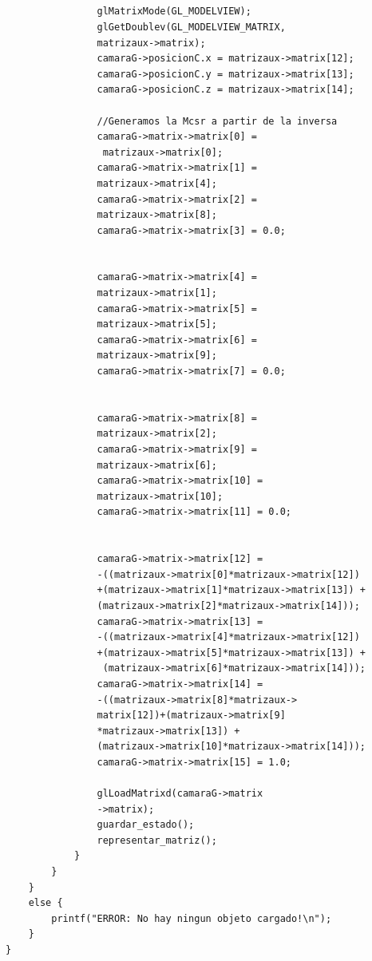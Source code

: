 \documentclass[12pt,a4paper]{article}
\begin{document}
\begin{enumerate}
\begin{lstlisting}
        		

        		
        		
        		glMatrixMode(GL_MODELVIEW);
        		glGetDoublev(GL_MODELVIEW_MATRIX,
        		matrizaux->matrix);
        		camaraG->posicionC.x = matrizaux->matrix[12];
        		camaraG->posicionC.y = matrizaux->matrix[13];
        		camaraG->posicionC.z = matrizaux->matrix[14];

				//Generamos la Mcsr a partir de la inversa
				camaraG->matrix->matrix[0] =
				 matrizaux->matrix[0];
				camaraG->matrix->matrix[1] = 
				matrizaux->matrix[4];
				camaraG->matrix->matrix[2] = 
				matrizaux->matrix[8];	
				camaraG->matrix->matrix[3] = 0.0;

	
				camaraG->matrix->matrix[4] = 
				matrizaux->matrix[1];
				camaraG->matrix->matrix[5] = 
				matrizaux->matrix[5];	
				camaraG->matrix->matrix[6] = 
				matrizaux->matrix[9];	
				camaraG->matrix->matrix[7] = 0.0;
	
	
				camaraG->matrix->matrix[8] = 
				matrizaux->matrix[2];	
				camaraG->matrix->matrix[9] = 
				matrizaux->matrix[6];
				camaraG->matrix->matrix[10] = 
				matrizaux->matrix[10];
				camaraG->matrix->matrix[11] = 0.0;
	
	
				camaraG->matrix->matrix[12] = 
				-((matrizaux->matrix[0]*matrizaux->matrix[12])
				+(matrizaux->matrix[1]*matrizaux->matrix[13]) +
				(matrizaux->matrix[2]*matrizaux->matrix[14]));
				camaraG->matrix->matrix[13] = 
				-((matrizaux->matrix[4]*matrizaux->matrix[12])
				+(matrizaux->matrix[5]*matrizaux->matrix[13]) +
				 (matrizaux->matrix[6]*matrizaux->matrix[14]));				
				camaraG->matrix->matrix[14] = 
				-((matrizaux->matrix[8]*matrizaux->
				matrix[12])+(matrizaux->matrix[9]
				*matrizaux->matrix[13]) + 
				(matrizaux->matrix[10]*matrizaux->matrix[14]));
				camaraG->matrix->matrix[15] = 1.0;

				glLoadMatrixd(camaraG->matrix
				->matrix);	
        		guardar_estado();
        		representar_matriz();
            }  
        }
    }
    else {
        printf("ERROR: No hay ningun objeto cargado!\n");
    }
}



\end{lstlisting}



\end{enumerate}
\end{document}
